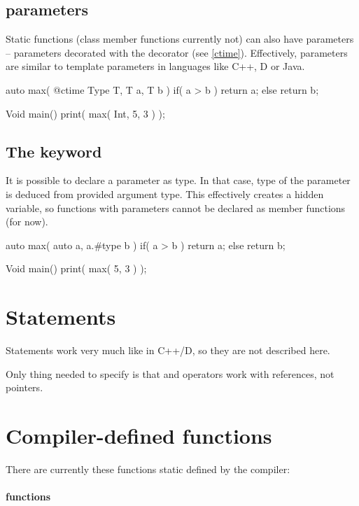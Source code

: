 \subsection{\ctime parameters} \label{function:ctimeParams}
Static functions (class member functions currently not) can also have \ctime parameters -- parameters decorated with the \ctime decorator (see \autoref{ctime}). Effectively, \ctime parameters are similar to template parameters in languages like C++, D or Java.

\begin{code}
auto max( @ctime Type T, T a, T b ) {
	if( a > b )
		return a;
	else
		return b;
}
	
Void main() {
	print( max( Int, 5, 3 ) );
}
\end{code}

\subsection{The  keyword}
It is possible to declare a parameter as  type. In that case, type of the parameter is deduced from provided argument type. This effectively creates a hidden  variable, so functions with  parameters cannot be declared as member functions (for now).

\begin{code}
auto max( auto a, a.#type b ) {
	if( a > b )
		return a;
	else
		return b;
}

Void main() {
	print( max( 5, 3 ) );
}
\end{code}

\section{Statements}
Statements work very much like in C++/D, so they are not described here.

Only thing needed to specify is that  and  operators work with references, not pointers.

\section{Compiler-defined functions} \label{compilerFunctions}
There are currently these functions static defined by the compiler:

\paragraph{ functions}~

